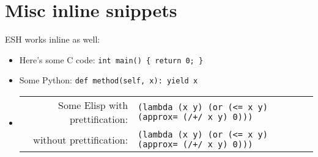 \documentclass{article}
\def\cverb{\verb}
\def\pythonverb{\verb}
\def\prettylisp{\verb}
\def\normallisp{\verb}
\begin{document}
\clearpage

\section*{Misc inline snippets}

ESH works inline as well:

\begin{itemize}
\item Here's some C code: \cverb|int main() { return 0; }|
\item Some Python: \pythonverb|def method(self, x): yield x|
\item
  \begin{tabular}[t]{@{}r@{ }l}
    Some Elisp with prettification: & \prettylisp|(lambda (x y) (or (<= x y) (approx= (/+/ x y) 0)))| \\
            without prettification: & \normallisp|(lambda (x y) (or (<= x y) (approx= (/+/ x y) 0)))| \\
  \end{tabular}
\end{itemize}


%
%
%
%
%
%
\end{document}
